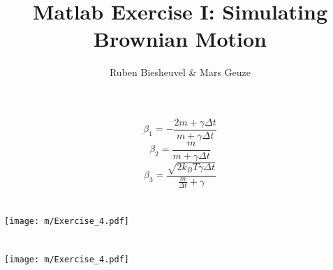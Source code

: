 \documentclass[12pt]{article}
\begin{document}
	\title{Matlab Exercise I: Simulating Brownian Motion}
	\author{Ruben Biesheuvel \& Mars Geuze}
	\maketitle


\section{}
\begin{equation}
	\beta_1 = -\frac{2m + \gamma\Delta t}{m+\gamma\Delta t}
\end{equation}
\begin{equation}
	\beta_2 = \frac{m}{m+\gamma\Delta t}
\end{equation}
\begin{equation}
	\beta_3 = \frac{\sqrt{2k_BT\gamma\Delta t}}{\frac{m}{\Delta t}+\gamma}
\end{equation}

\newpage\section{}



\newpage\section{}



\newpage\section{}

\texttt{[image: m/Exercise\_4.pdf]} 

\newpage\section{}

\texttt{[image: m/Exercise\_4.pdf]} 
\end{document}

